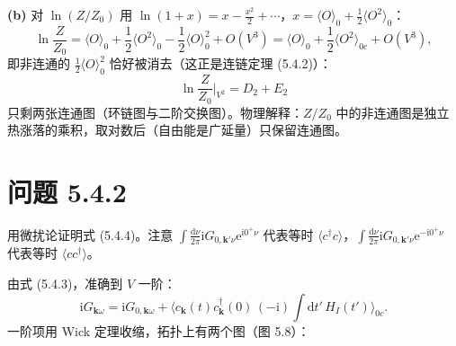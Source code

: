 \textbf{(b)} 对 $\ln(Z/Z_0)$ 用 $\ln(1+x)=x-\frac{x^{2}}{2}+\cdots$，$x=\langle O\rangle_0+\frac12\langle O^{2}\rangle_0$：
\begin{equation*}
\ln\frac{Z}{Z_0}=\langle O\rangle_0+\frac12\langle O^{2}\rangle_0-\frac12\langle O\rangle_0^{2}+O(V^{3})
=\langle O\rangle_0+\frac12\langle O^{2}\rangle_{0c}+O(V^{3}),
\end{equation*}
即非连通的 $\frac12\langle O\rangle_0^{2}$ 恰好被消去（这正是连链定理 (5.4.2)）：
\begin{equation*}
\boxed{\;\ln\frac{Z}{Z_0}\Big|_{V^{2}}=D_{2}+E_{2}\;}
\end{equation*}
只剩两张连通图（环链图与二阶交换图）。物理解释：$Z/Z_0$ 中的非连通图是独立热涨落的乘积，取对数后（自由能是广延量）只保留连通图。

\section*{问题 5.4.2}
\begin{problem}
用微扰论证明式 (5.4.4)。注意 $\int\frac{\mathrm{d}\nu}{2\pi}\mathrm{i}G_{0,\pmb{k}'\nu}\mathrm{e}^{\mathrm{i}0^{+}\nu}$ 代表等时 $\langle c^{\dagger}c\rangle$，$\int\frac{\mathrm{d}\nu}{2\pi}\mathrm{i}G_{0,\pmb{k}'\nu}\mathrm{e}^{-\mathrm{i}0^{+}\nu}$ 代表等时 $\langle cc^{\dagger}\rangle$。
\end{problem}
\solution

由式 (5.4.3)，准确到 $V$ 一阶：
\begin{equation*}
\mathrm{i}G_{\pmb{k}\omega}=\mathrm{i}G_{0,\pmb{k}\omega}
+\big\langle c_{\pmb{k}}(t)c_{\pmb{k}}^{\dagger}(0)\,(-\mathrm{i})\!\int\!\mathrm{d}t'\,H_I(t')\big\rangle_{0c} .
\end{equation*}
一阶项用 Wick 定理收缩，拓扑上有两个图（图 5.8）：

